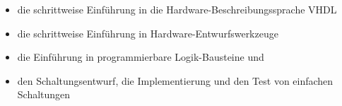 \begin{module}
\begin{content}
 \begin{itemize}\item die schrittweise Einführung in die Hardware-Beschreibungssprache VHDL  \item die schrittweise Einführung in Hardware-Entwurfswerkzeuge   \item die Einführung in programmierbare Logik-Bausteine und  \item den Schaltungsentwurf, die Implementierung und den Test von einfachen Schaltungen   \end{itemize}
\end{content}



\end{module}

